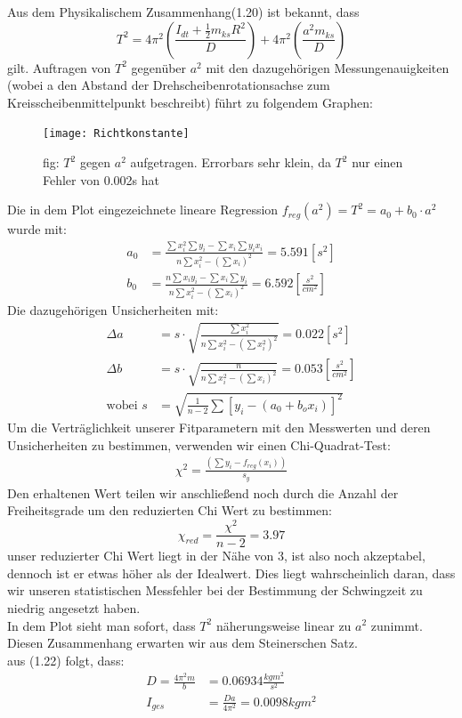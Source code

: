 \documentclass[11pt,a4paper]{article}
\begin{document}
	Aus dem Physikalischem Zusammenhang(1.20) ist bekannt, dass
	\begin{equation}
		T^2 = 4 \pi^2 \left(\frac{I_{dt}+ \frac{1}{2} m_{ks}R^2}{D}\right) +4\pi^2 \left(\frac{a^2m_{ks}}{D}\right)
	\end{equation}
	gilt.
	Auftragen von $T^2$ gegenüber $a^2$ mit den dazugehörigen Messungenauigkeiten (wobei a den Abstand der Drehscheibenrotationsachse zum Kreisscheibenmittelpunkt beschreibt) führt zu folgendem Graphen:\\
	\begin{figure}[H]
	\texttt{[image: Richtkonstante]}
	\caption[]{fig: $T^2$ gegen $a^2$ aufgetragen. Errorbars sehr klein, da $T^2$ nur einen Fehler von 0.002s hat}
	\end{figure}
	Die in dem Plot eingezeichnete lineare Regression $f_{reg}(a^2)=T^2=a_0 + b_0 \cdot a^2$ wurde mit:
	\begin{align}
	a_0 &= \frac{\sum x_i^2 \sum y_i -\sum x_i \sum y_i x_i}{n\sum x_i^2 -(\sum x_i)^2}=5.591[s^2]\\
	b_0 &= \frac{n \sum x_i y_i - \sum x_i \sum y_i}{n \sum x_i^2 - (\sum x_i)^2}=6.592 [\frac{s^2}{cm^2}]
	\end{align}
	Die dazugehörigen Unsicherheiten mit:
	\begin{align}
	\Delta a &= s \cdot \sqrt{\frac{\sum x_i^2}{n \sum x_i^2 - (\sum x_i^2)^2}}=0.022[s^2]\\
	\Delta b &= s \cdot \sqrt{\frac{n}{n \sum x_i^2 - (\sum x_i)^2}}=0.053[\frac{s^2}{cm^2}]\\
	 \text{wobei  } s&=\sqrt{\frac{1}{n-2} \sum [y_i -( a_0 + b_o x_i)]^2}
	\end{align}
	Um die Verträglichkeit unserer Fitparametern mit den Messwerten und deren Unsicherheiten zu bestimmen,
	verwenden wir einen Chi-Quadrat-Test:
	\begin{align}
	\chi ^2 = \frac{(\sum y_i - f_{reg}(x_i))}{s_y}
	\end{align}
	Den erhaltenen Wert teilen wir anschließend noch durch die Anzahl der Freiheitsgrade um den reduzierten Chi Wert zu bestimmen:
	$$\chi _{red} = \frac{\chi ^2 }{n-2} =3.97$$
	unser reduzierter Chi Wert liegt in der Nähe von 3, ist also noch akzeptabel, dennoch ist er etwas höher als der Idealwert.
	Dies liegt wahrscheinlich daran, dass wir unseren statistischen Messfehler bei der Bestimmung der Schwingzeit zu niedrig angesetzt haben.\vspace{2cm}\\
	In dem Plot sieht man sofort, dass $T^2$ näherungsweise linear zu $a^2$ zunimmt. Diesen Zusammenhang erwarten wir aus dem Steinerschen Satz.
	\\
	aus (1.22) folgt, dass:
	\begin{align}
	D=\frac{4 \pi ^2 m}{b}&=0.06934 \frac{kg m^2}{s^2}\\
	I_{ges}&= \frac{Da}{4 \pi^2} =0.0098 kg m^2
	\end{align}
\end{document}
